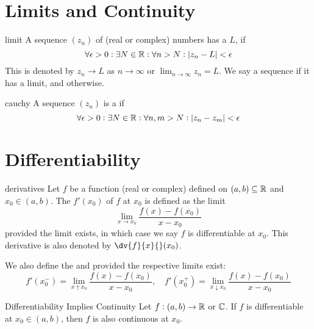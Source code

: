 \documentclass{styles/tufte}
\author{Jiaming (George) Yu}
\date{\today}
\begin{document}
\maketitle
\tableofcontents
\newpage



\section{Limits and Continuity}

\begin{definition}{}{limit}
  A sequence $(z_n)$ of (real or complex) numbers has a  $L$, if
  \[ \forall \epsilon > 0 : \exists N \in \RR : \forall n > N : \abs{z_n - L} < \epsilon \]
  This is denoted by $z_n \to L$ as $n \to \infty$ or $\displaystyle\lim_{n \to \infty} z_n = L$. We say a sequence  if it has a limit, and  otherwise.
\end{definition}

\begin{definition}{}{cauchy}
  A sequence $(z_n)$ is a  if
  \[ \forall \epsilon > 0 : \exists N \in \RR : \forall n, m > N : \abs{z_n - z_m} < \epsilon \]
\end{definition}



\section{Differentiability}

\begin{definition}{}{derivatives}
  Let $f$ be a function (real or complex) defined on $(a, b) \subseteq \mathbb{R}$ and $x_0 \in (a, b)$. The  $f'(x_0)$ of $f$ at $x_0$ is defined as the limit
  \[ \lim_{x \to x_0} \frac{f(x) - f(x_0)}{x - x_0} \]
  provided the limit exists, in which case we say $f$ is differentiable at $x_0$. This derivative is also denoted by $\dv{f}{x}{}(x_0)$.
  
  We also define the  and  provided the respective limits exist:
  \[ f'(x_0^-) = \lim_{x \uparrow x_0} \frac{f(x) - f(x_0)}{x - x_0}, \quad f'(x_0^+) = \lim_{x \downarrow x_0} \frac{f(x) - f(x_0)}{x - x_0} \]
\end{definition}

\begin{theorem}{Differentiability Implies Continuity}{}
  Let $f: (a, b) \to \mathbb{R}$ or $\mathbb{C}$. If $f$ is differentiable at $x_0 \in (a, b)$, then $f$ is also continuous at $x_0$.
\end{theorem}
\end{document}
